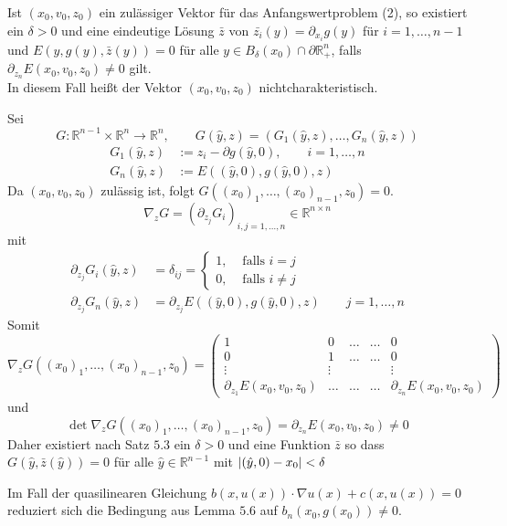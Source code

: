 \begin{lemma}
	Ist $(x_0,v_0,z_0)$ ein zulässiger Vektor für das Anfangswertproblem (2), so existiert ein $\delta >0$ und eine eindeutige Lösung $\bar{z}$ von 
	$\bar{z_i}(y) = \partial_{x_i}g(y)$ für $i=1,\dots,n-1$ und $E(y,g(y),\bar{z}(y))=0$ für alle $y \in B_{\delta }(x_0) \cap \partial \mathbb{R}^n_+$, falls 
	$\partial_{z_n} E(x_0,v_0,z_0) \neq 0$ gilt. \\
	In diesem Fall heißt der Vektor $(x_0,v_0,z_0)$ nichtcharakteristisch.
\end{lemma}
\begin{beweis}
	Sei
	\[
		G: \mathbb{R}^{n-1} \times \mathbb{R}^n \to \mathbb{R}^n, \qquad G(\hat{y},z)= (G_1(\hat{y},z), \dots, G_n(\hat{y},z)) 
	\]
	\begin{align*}
		G_1(\hat{y},z) &:= z_i - \partial g(\hat{y},0), \qquad i=1,\dots,n \\
		G_n(\hat{y},z) &:= E((\hat{y},0),g(\hat{y},0),z)
	\end{align*}
	Da $(x_0,v_0,z_0)$ zulässig ist, folgt $G((x_0)_1, \dots, (x_0)_{n-1},z_0)=0$.
	\[
		 \nabla _z G = (\partial_{z_j}G_i)_{i,j=1,\dots,n} \in \mathbb{R}^{n \times n}
	\]
	mit
	\begin{align*}
		\partial_{z_j} G_i ( \hat{y}, z) &= \delta _{ij} = \begin{cases}
			1, &\text{ falls }i = j\\
			0, &\text{ falls }i \neq j
		\end{cases} \\
		\partial_{z_j} G_n(\hat{y},z) &= \partial_{z_j} E((\hat{y},0),g(\hat{y},0),z) \qquad j=1,\dots,n
	\end{align*}
	Somit
	\[
		 \nabla_z G((x_0)_1, \dots, (x_0)_{n-1},z_0) = \begin{pmatrix}
		 	1 & 0 & \dots & \dots & 0 \\
			0 & 1 & \dots & \dots & 0 \\
			\vdots & \vdots & & & \vdots \\
			\partial_{z_1}E(x_0,v_0,z_0) & \dots & \dots & \dots & \partial_{z_n} E(x_0,v_0,z_0)
		 \end{pmatrix}
	\]
	und \[
		\det  \nabla_z G((x_0)_1,\dots,(x_0)_{n-1},z_0) = \partial_{z_n}E(x_0,v_0,z_0) \neq 0
	\]
	Daher existiert nach Satz $5.3$ ein $\delta >0$ und eine Funktion $\bar{z}$ so dass $G(\hat{y},\bar{z}(\hat{y}))=0$ für alle $\hat{y} \in \mathbb{R}^{n-1}$ 
	mit $\lvert(\hat{y},0)-x_0\rvert < \delta $
\end{beweis}

\begin{bemerkung}
	Im Fall der quasilinearen Gleichung $b(x,u(x)) \cdot  \nabla u(x) + c(x,u(x)) = 0$ reduziert sich die Bedingung aus Lemma $5.6$ auf $b_n(x_0,g(x_0)) \neq 0$.
\end{bemerkung}

